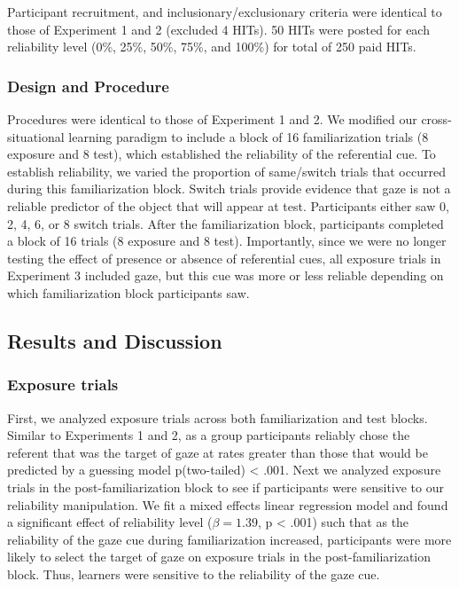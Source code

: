 \documentclass[12pt,]{article}
\begin{document}
Participant recruitment, and inclusionary/exclusionary criteria were
identical to those of Experiment 1 and 2 (excluded 4 HITs). 50 HITs were
posted for each reliability level (0\%, 25\%, 50\%, 75\%, and 100\%) for
total of 250 paid HITs.

\subsubsection{Design and Procedure}\label{design-and-procedure-2}

Procedures were identical to those of Experiment 1 and 2. We modified
our cross-situational learning paradigm to include a block of 16
familiarization trials (8 exposure and 8 test), which established the
reliability of the referential cue. To establish reliability, we varied
the proportion of same/switch trials that occurred during this
familiarization block. Switch trials provide evidence that gaze is not a
reliable predictor of the object that will appear at test. Participants
either saw 0, 2, 4, 6, or 8 switch trials. After the familiarization
block, participants completed a block of 16 trials (8 exposure and 8
test). Importantly, since we were no longer testing the effect of
presence or absence of referential cues, all exposure trials in
Experiment 3 included gaze, but this cue was more or less reliable
depending on which familiarization block participants saw.

\subsection{Results and Discussion}\label{results-and-discussion-2}

\subsubsection{Exposure trials}\label{exposure-trials-2}

First, we analyzed exposure trials across both familiarization and test
blocks. Similar to Experiments 1 and 2, as a group participants reliably
chose the referent that was the target of gaze at rates greater than
those that would be predicted by a guessing model p(two-tailed)
\textless{} .001. Next we analyzed exposure trials in the
post-familiarization block to see if participants were sensitive to our
reliability manipulation. We fit a mixed effects linear regression model
and found a significant effect of reliability level (\(\beta = 1.39\), p
\textless{} .001) such that as the reliability of the gaze cue during
familiarization increased, participants were more likely to select the
target of gaze on exposure trials in the post-familiarization block.
Thus, learners were sensitive to the reliability of the gaze cue.
\end{document}
